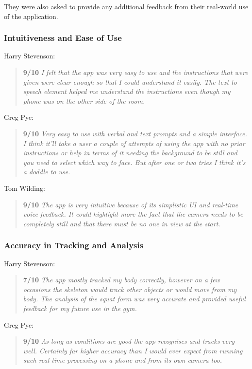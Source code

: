 They were also asked to provide any additional feedback from their real-world use of the application.

\pagebreak
\subsubsection{Intuitiveness and Ease of Use}

Harry Stevenson:
\begin{quote}
\textbf{9/10} \emph{I felt that the app was very easy to use and the instructions that were given were clear enough so that I could understand it easily. The text-to-speech element helped me understand the instructions even though my phone was on the other side of the room.}
\end{quote}

Greg Pye:
\begin{quote}
\textbf{9/10} \emph{Very easy to use with verbal and text prompts and a simple interface. I think it'll take a user a couple of attempts of using the app with no prior instructions or help in terms of it needing the background to be still and you need to select which way to face. But after one or two tries I think it's a doddle to use.}
\end{quote}

Tom Wilding:
\begin{quote}
\textbf{9/10} \emph{The app is very intuitive because of its simplistic UI and real-time voice feedback. It could highlight more the fact that the camera needs to be completely still and that there must be no one in view at the start.}
\end{quote}

\subsubsection{Accuracy in Tracking and Analysis}

Harry Stevenson:
\begin{quote}
\textbf{7/10} \emph{The app mostly tracked my body correctly, however on a few occasions the skeleton would track other objects or would move from my body. The analysis of the squat form was very accurate and provided useful feedback for my future use in the gym.}
\end{quote}

Greg Pye:
\begin{quote}
\textbf{9/10} \emph{As long as conditions are good the app recognises and tracks very well. Certainly far higher accuracy than I would ever expect from running such real-time processing on a phone and from its own camera too.}
\end{quote}

